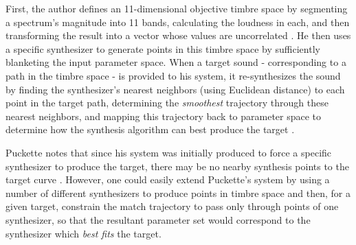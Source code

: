 \documentclass[12pt]{report} 	%
\numberwithin{figure}{chapter}
\numberwithin{table}{chapter}
\numberwithin{equation}{chapter}
\begin{document}
\begin{flushleft}
First, the author defines an 11-dimensional objective timbre space by segmenting a spectrum's magnitude into 11 bands, calculating the loudness in each, and then transforming the result into a vector whose values are uncorrelated \cite[p. 1-2]{Puckette:2004zp}. He then uses a specific synthesizer to generate points in this timbre space by sufficiently blanketing the input parameter space. When a target sound - corresponding to a path in the timbre space - is provided to his system, it re-synthesizes the sound by finding the synthesizer's nearest neighbors (using Euclidean distance) to each point in the target path, determining the \textit{smoothest} trajectory through these nearest neighbors, and mapping this trajectory back to parameter space to determine how the synthesis algorithm can best produce the target \cite[p. 3]{Puckette:2004zp}. 

Puckette notes that since his system was initially produced to force a specific synthesizer to produce the target, there may be no nearby synthesis points to the target curve \cite[p. 3]{Puckette:2004zp}. However, one could easily extend Puckette's system by using a number of different synthesizers to produce points in timbre space and then, for a given target, constrain the match trajectory to pass only through points of one synthesizer, so that the resultant parameter set would correspond to the synthesizer which \textit{best fits} the target. 


\end{flushleft}
\end{document}
